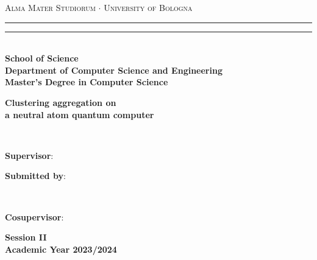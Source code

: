 \begin{titlepage}
  \begin{center}
      {{\Large{\textsc{Alma Mater Studiorum $\cdot$ University of Bologna}}}}
      \rule[0.1cm]{\textwidth}{0.1mm}
      \rule[0.5cm]{\textwidth}{0.6mm}\\
      {\small{\bf School of Science\\
      Department of Computer Science and Engineering\\
      Master's Degree in Computer Science}}
  \end{center}
  
  \vspace{25mm}
  
  \begin{center}
      
      {\LARGE{\bf Clustering aggregation on}}\\
      \vspace{3mm}
      {\LARGE{\bf a neutral atom quantum computer}}\\
  \end{center}
  
  \vspace{60mm}
  \par
  \noindent
  \begin{minipage}[t]{0.04\textwidth}
  ~
  \end{minipage}
  \begin{minipage}[t]{0.4\textwidth}
  {\large{\textbf{Supervisor}:\\
  \supname
  }}
  \end{minipage}
  \hfill
  \begin{minipage}[t]{0.4\textwidth}\raggedleft
  {\large{\textbf{Submitted by}:\\
  \authorname}}
  \end{minipage}
  \begin{minipage}[t]{0.04\textwidth}
  ~
  \end{minipage}
  
  \vspace{10mm}
  \begin{minipage}[t]{0.4\textwidth}
  \large{\textbf{Cosupervisor}:\\
  \cosupname}
  \end{minipage}
  
  \vspace{30mm}
  
  \begin{center}
      {\large{\bf Session II\\
      Academic Year 2023/2024 }}
  \end{center}
  \end{titlepage}